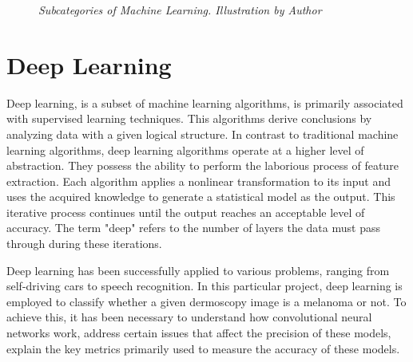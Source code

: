 \begin{figure}[H]
  \centering
    \caption[Subcategories of Machine Learning.]{\textit{Subcategories of Machine Learning. Illustration by Author}}
    {\label{fig:ml_branches}}
\end{figure}


\section{Deep Learning}

Deep learning, is a subset of machine learning algorithms, is primarily
associated with supervised learning techniques. This algorithms derive
conclusions by analyzing data with a given logical structure. In contrast to
traditional machine learning algorithms, deep learning algorithms operate at a
higher level of abstraction. They possess the ability to perform the laborious
process of feature extraction. Each algorithm applies a nonlinear
transformation to its input and uses the acquired knowledge to generate a
statistical model as the output. This iterative process continues until the
output reaches an acceptable level of accuracy. The term "deep" refers to the
number of layers the data must pass through during these iterations. \newline

Deep learning has been successfully applied to various problems, ranging from
self-driving cars to speech recognition. In this particular project, deep
learning is employed to classify whether a given dermoscopy image is a melanoma
or not. To achieve this, it has been necessary to understand how convolutional
neural networks work, address certain issues that affect the precision of these
models, explain the key metrics primarily used to measure the accuracy of these
models.


